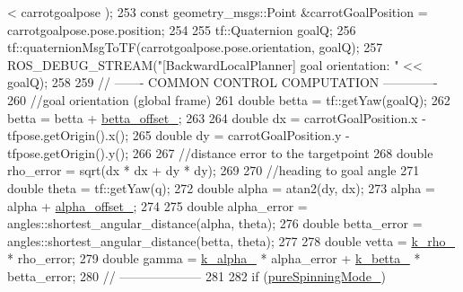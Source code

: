\begin{DoxyCode}
      < carrotgoalpose );
253                 \textcolor{keyword}{const} geometry\_msgs::Point &carrotGoalPosition = carrotgoalpose.pose.position;
254 
255                 tf::Quaternion goalQ;
256                 tf::quaternionMsgToTF(carrotgoalpose.pose.orientation, goalQ);
257                 ROS\_DEBUG\_STREAM(\textcolor{stringliteral}{"[BackwardLocalPlanner] goal orientation: "} << goalQ);
258 
259                 \textcolor{comment}{// ------- COMMON CONTROL COMPUTATION -------------}
260                 \textcolor{comment}{//goal orientation (global frame)}
261                 \textcolor{keywordtype}{double} betta = tf::getYaw(goalQ);
262                 betta = betta + \hyperlink{classcl__move__base__z_1_1backward__local__planner_1_1BackwardLocalPlanner_a07e5f16f6951cca1e6d3483f345d0bb1}{betta\_offset\_};
263 
264                 \textcolor{keywordtype}{double} dx = carrotGoalPosition.x - tfpose.getOrigin().x();
265                 \textcolor{keywordtype}{double} dy = carrotGoalPosition.y - tfpose.getOrigin().y();
266 
267                 \textcolor{comment}{//distance error to the targetpoint}
268                 \textcolor{keywordtype}{double} rho\_error = sqrt(dx * dx + dy * dy);
269 
270                 \textcolor{comment}{//heading to goal angle}
271                 \textcolor{keywordtype}{double} theta = tf::getYaw(q);
272                 \textcolor{keywordtype}{double} alpha = atan2(dy, dx);
273                 alpha = alpha + \hyperlink{classcl__move__base__z_1_1backward__local__planner_1_1BackwardLocalPlanner_a09765b08935d9355447c44776e1b1c3a}{alpha\_offset\_};
274 
275                 \textcolor{keywordtype}{double} alpha\_error = angles::shortest\_angular\_distance(alpha, theta);
276                 \textcolor{keywordtype}{double} betta\_error = angles::shortest\_angular\_distance(betta, theta);
277 
278                 \textcolor{keywordtype}{double} vetta = \hyperlink{classcl__move__base__z_1_1backward__local__planner_1_1BackwardLocalPlanner_ad8a36184bfb011545c751109e23d3b98}{k\_rho\_} * rho\_error;
279                 \textcolor{keywordtype}{double} gamma = \hyperlink{classcl__move__base__z_1_1backward__local__planner_1_1BackwardLocalPlanner_abf7a5a56de2ee41afba7e63c0628ec35}{k\_alpha\_} * alpha\_error + \hyperlink{classcl__move__base__z_1_1backward__local__planner_1_1BackwardLocalPlanner_a9f257183d87f1d732cb7e404f09905ad}{k\_betta\_} * betta\_error;
280                 \textcolor{comment}{// --------------------}
281 
282                 \textcolor{keywordflow}{if} (\hyperlink{classcl__move__base__z_1_1backward__local__planner_1_1BackwardLocalPlanner_aebc89ccfa79fdf6bd45ba35134bec3fb}{pureSpinningMode\_})

\end{DoxyCode}
